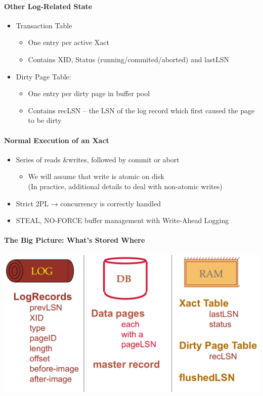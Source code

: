 \paragraph{Other Log-Related State}
\begin{itemize}
\item Transaction Table
  \begin{itemize}
  \item One entry per active Xact
  \item Contains XID, Status (running/commited/aborted) and lastLSN
  \end{itemize}

\item Dirty Page Table:
  \begin{itemize}
  \item One entry per dirty page in buffer pool
  \item Contains recLSN -- the LSN of the log record which first
    caused the page to be dirty
  \end{itemize}
\end{itemize}


\paragraph{Normal Execution of an Xact}
\begin{itemize}
\item Series of reads \&writes, followed by commit or abort
  \begin{itemize}
  \item We will assume that write is atomic on disk \\
    (In practice, additional details to deal with non-atomic writes)
  \end{itemize}

\item Strict 2PL → concurrency is correctly handled

\item STEAL, NO-FORCE buffer management with Write-Ahead Logging
\end{itemize}

\paragraph{The Big Picture: What's Stored Where}

\includegraphics[scale=0.15]{graphics/logging-big-picture.png}


